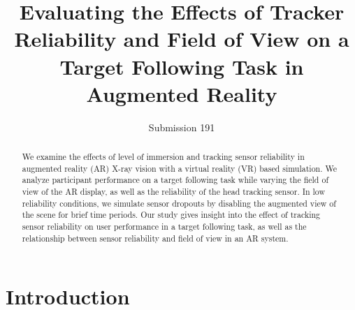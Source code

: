 \documentclass{acmsiggraph}                     %
\title{Evaluating the Effects of Tracker Reliability and Field of View on a Target Following Task in Augmented Reality}
\author{
Submission 191
}
\begin{document}


\maketitle


\begin{abstract}

We examine the effects of level of immersion and tracking sensor reliability in augmented reality (AR) X-ray vision with a virtual reality (VR) based simulation.  We analyze participant performance on a target following task while varying the field of view of the AR display, as well as the reliability of the head tracking sensor.  In low reliability conditions, we simulate sensor dropouts by disabling the augmented view of the scene for brief time periods.  Our study gives insight into the effect of tracking sensor reliability on user performance in a target following task, as well as the relationship between sensor reliability and field of view in an AR system.

\end{abstract}


\begin{CRcatlist}
\end{CRcatlist}

\keywordlist

\section{Introduction}

\end{document}
